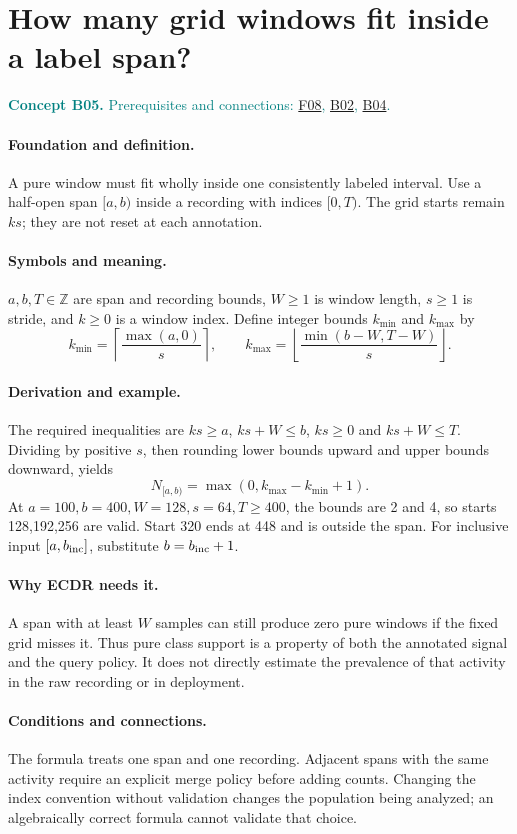 \documentclass[11pt,a4paper]{article}
\newcommand{\conceptid}{Front matter}
\newcommand{\concept}[3]{\clearpage\renewcommand{\conceptid}{#1}%
\section{#2}\label{concept:#1}%
\textcolor{teal}{\textbf{Concept #1.} Prerequisites and connections: #3.}\par
\typeout{ECDR-CONCEPT-START #1 PAGE=\thepage}}
\begin{document}
\concept{B05}{How many grid windows fit inside a label span?}{\hyperref[concept:F08]{F08}, \hyperref[concept:B02]{B02}, \hyperref[concept:B04]{B04}}
\paragraph{Foundation and definition.}
A pure window must fit wholly inside one consistently labeled interval.
Use a half-open span $[a,b)$ inside a recording with indices $[0,T)$.
The grid starts remain $ks$; they are not reset at each annotation.
\paragraph{Symbols and meaning.}
$a,b,T\in\mathbb Z$ are span and recording bounds, $W\ge1$ is window
length, $s\ge1$ is stride, and $k\ge0$ is a window index. Define integer
bounds $k_{\min}$ and $k_{\max}$ by
\[
 k_{\min}=\left\lceil\frac{\max(a,0)}s\right\rceil,\qquad
 k_{\max}=\left\lfloor\frac{\min(b-W,T-W)}s\right\rfloor.
\]
\paragraph{Derivation and example.}
The required inequalities are $ks\ge a$, $ks+W\le b$, $ks\ge0$ and
$ks+W\le T$. Dividing by positive $s$, then rounding lower bounds upward
and upper bounds downward, yields
\[
 N_{[a,b)}=\max(0,k_{\max}-k_{\min}+1).
\]
At $a=100,b=400,W=128,s=64,T\ge400$, the bounds are 2 and 4, so starts
128,192,256 are valid. Start 320 ends at 448 and is outside the span.
For inclusive input $[a,b_{\rm inc}]$, substitute $b=b_{\rm inc}+1$.
\paragraph{Why ECDR needs it.}
A span with at least $W$ samples can still produce zero pure windows if
the fixed grid misses it. Thus pure class support is a property of both
the annotated signal and the query policy. It does not directly estimate
the prevalence of that activity in the raw recording or in deployment.
\paragraph{Conditions and connections.}
The formula treats one span and one recording. Adjacent spans with the
same activity require an explicit merge policy before adding counts.
Changing the index convention without validation changes the population
being analyzed; an algebraically correct formula cannot validate that choice.
\par\label{endconcept:B05}
\end{document}
